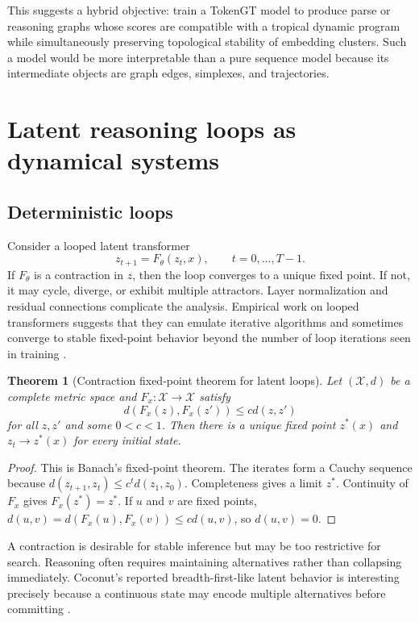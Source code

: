 \documentclass[11pt]{article}
\newtheorem{theorem}[definition]{Theorem}
\newcommand{\calX}{\mathcal{X}}
\newcommand{\1}{\mathbf{1}}
\begin{document}
This suggests a hybrid objective: train a TokenGT model to produce parse or reasoning graphs whose scores are compatible with a tropical dynamic program while simultaneously preserving topological stability of embedding clusters. Such a model would be more interpretable than a pure sequence model because its intermediate objects are graph edges, simplexes, and trajectories.

\section{Latent reasoning loops as dynamical systems}

\subsection{Deterministic loops}

Consider a looped latent transformer
\[
z_{t+1}=F_\theta(z_t,x),\qquad t=0,\ldots,T-1.
\]
If $F_\theta$ is a contraction in $z$, then the loop converges to a unique fixed point. If not, it may cycle, diverge, or exhibit multiple attractors. Layer normalization and residual connections complicate the analysis. Empirical work on looped transformers suggests that they can emulate iterative algorithms and sometimes converge to stable fixed-point behavior beyond the number of loop iterations seen in training \cite{YangLooped2024,Saunshi2025}.

\begin{theorem}[Contraction fixed-point theorem for latent loops]
Let $(\calX,d)$ be a complete metric space and $F_x:\calX\to\calX$ satisfy
\[
d(F_x(z),F_x(z'))\le c d(z,z')
\]
for all $z,z'$ and some $0<c<1$. Then there is a unique fixed point $z^*(x)$ and $z_t\to z^*(x)$ for every initial state.
\end{theorem}
\begin{proof}
This is Banach's fixed-point theorem. The iterates form a Cauchy sequence because $d(z_{t+1},z_t)\le c^t d(z_1,z_0)$. Completeness gives a limit $z^*$. Continuity of $F_x$ gives $F_x(z^*)=z^*$. If $u$ and $v$ are fixed points, $d(u,v)=d(F_x(u),F_x(v))\le c d(u,v)$, so $d(u,v)=0$.
\end{proof}

A contraction is desirable for stable inference but may be too restrictive for search. Reasoning often requires maintaining alternatives rather than collapsing immediately. Coconut's reported breadth-first-like latent behavior is interesting precisely because a continuous state may encode multiple alternatives before committing \cite{Hao2024}.
\end{document}
